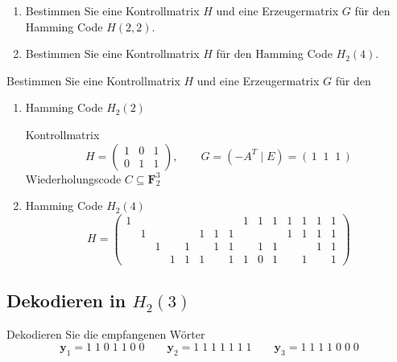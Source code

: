 \begin{aufgabe}[5\_3]
\begin{enumerate}[label=\alph*)]
\item Bestimmen Sie eine Kontrollmatrix $H$ und eine Erzeugermatrix $G$ für den Hamming Code $H(2,2)$.
\item Bestimmen Sie eine Kontrollmatrix $H$ für den Hamming Code $H_2(4)$.
\end{enumerate}
\end{aufgabe}

\begin{loesung}
Bestimmen Sie eine Kontrollmatrix $H$ und eine Erzeugermatrix $G$ für den
\begin{enumerate}[label=\alph*)]
\item Hamming Code $H_2(2)$

Kontrollmatrix
\[
H = \begin{pmatrix} 1 & 0 & 1\\ 0 & 1 & 1 \end{pmatrix}, \qquad
G = (-A^T \mid E) = (\,1\;\;1\;\;1\,)
\]
Wiederholungscode $C \subseteq \mathbf{F}_2^3$
\item Hamming Code $H_2(4)$
\[
H =
\begin{pmatrix}
1 & & & & & & & & 1 & 1 & 1 & 1 & 1 & 1 & 1\\
& 1 & & & & 1 & 1 & 1 & & & & 1 & 1 & 1 & 1\\
& & 1 & & 1 & & 1 & 1 & & 1 & 1 & & & 1 & 1\\
& & & 1 & 1 & 1 & & 1 & 1 & 0 & 1 & & 1 & & 1
\end{pmatrix}
\]
\end{enumerate}
\end{loesung}

\subsection{Dekodieren in $H_2(3)$}

\begin{aufgabe}[5\_4]
Dekodieren Sie die empfangenen Wörter
\[
\mathbf{y}_1 = 1\;1\;0\;1\;1\;0\;0 \qquad
\mathbf{y}_2 = 1\;1\;1\;1\;1\;1\;1 \qquad
\mathbf{y}_3 = 1\;1\;1\;1\;0\;0\;0
\]
\end{aufgabe}

